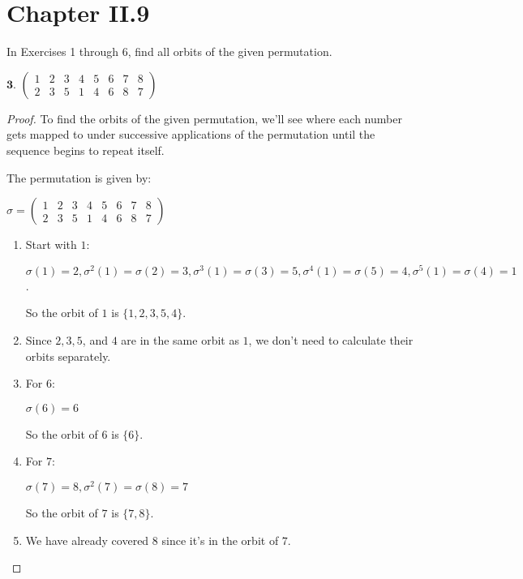 \documentclass[12pt]{amsart}
\theoremstyle{definition}
\numberwithin{equation}{section}
\theoremstyle{plain}
\begin{document}
\section*{Chapter II.9}
\begin{exercise}{3} In Exercises 1 through 6, find all orbits of the given permutation.

    \(\textbf{3. } \begin{pmatrix}
        1&2&3&4&5&6&7&8\\
        2&3&5&1&4&6&8&7
    \end{pmatrix}\)

    \begin{proof}
    To find the orbits of the given permutation, we'll see where each number gets mapped to under successive applications of the permutation until the sequence begins to repeat itself. 

    The permutation is given by:
    
    \(\sigma = \begin{pmatrix} 1&2&3&4&5&6&7&8\\ 2&3&5&1&4&6&8&7 \end{pmatrix}\)
    
    \begin{enumerate}
        \item Start with \(1\):
        
        \( \sigma(1) = 2, \sigma^2(1) = \sigma(2) = 3, \sigma^3(1) = \sigma(3) = 5, \sigma^4(1) = \sigma(5) = 4, \sigma^5(1) = \sigma(4) = 1\).
        
        So the orbit of \(1\) is \(\{1, 2, 3, 5, 4\}\).
        
        \item Since \(2, 3, 5\), and \(4\) are in the same orbit as \(1\), we don't need to calculate their orbits separately.
        
        \item For \(6\):
        
        \( \sigma(6) = 6\)
        
        So the orbit of \(6\) is \(\{6\}\).
        
        \item For \(7\):
        
        \( \sigma(7) = 8, \sigma^2(7) = \sigma(8) = 7\)
        
        So the orbit of \(7\) is \(\{7, 8\}\).
        
        \item We have already covered \(8\) since it's in the orbit of \(7\).
    \end{enumerate}
    

\end{proof}
\end{exercise}
\end{document}
